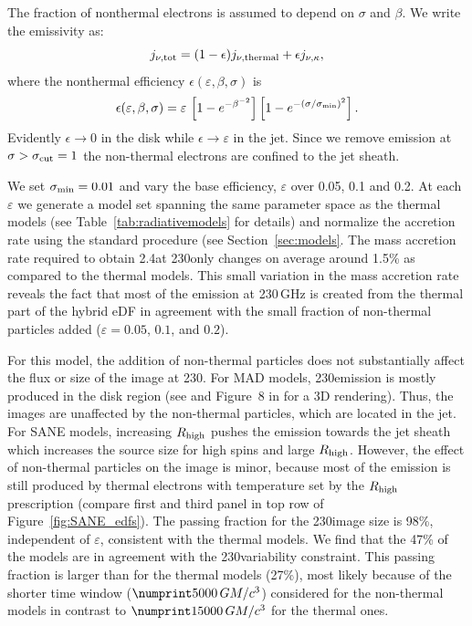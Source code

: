The fraction of nonthermal electrons is assumed to depend on $\sigma$ and $\beta$.
We write the emissivity as:
\begin{equation}
  j_{\nu,\rm{tot}}=(1-\epsilon) j_{\nu,\rm{thermal}} + \epsilon j_{\nu, \kappa},
  \label{eq:kappaeff}
\end{equation}
where the nonthermal efficiency $\epsilon(\varepsilon, \beta, \sigma)$ is
\begin{equation}
  \epsilon(\varepsilon,\beta,\sigma)=\varepsilon\,
  \left[1 - e^{-\beta^{-2}}\right]
  \left[1-e^{-(\sigma/\sigma_{\rm min})^2}\right].
  \label{eq:efficiencybetasigma}
\end{equation}
Evidently $\epsilon \rightarrow 0$ in the disk while $\epsilon \rightarrow \varepsilon$ in the jet.
Since we remove emission at $\sigma > \sigma_{\rm cut} = 1$ the non-thermal electrons are confined to the jet sheath.

We set $\sigma_{\rm min}=0.01$ and vary the base efficiency, $\varepsilon$ over 0.05, 0.1 and 0.2.
At each $\varepsilon$ we generate a model set spanning the same parameter space as the thermal models (see Table~\ref{tab:radiativemodels} for details) and normalize the accretion rate using the standard procedure (see Section~\ref{sec:models}.
The mass accretion rate required to obtain 2.4\Jy at 230\GHz only changes on average around 1.5\% as compared to the thermal models.
This small variation in the mass accretion rate reveals the fact that most of the emission at 230\,GHz is created from the thermal part of the hybrid eDF in agreement with the small fraction of non-thermal particles added ($\varepsilon=0.05$, $0.1$, and $0.2$).

\label{varkappa230}

For this model, the addition of non-thermal particles does not substantially affect the flux or size of the image at 230\GHz.
For MAD models, 230\GHz emission is mostly produced in the disk region (see  and Figure~8 in \citealt{Wong_2022} for a 3D rendering).
Thus, the images are unaffected by the non-thermal particles, which are located in the jet.
For SANE models, increasing $R_\mathrm{high}$ pushes the emission towards the jet sheath which increases the source size for high spins and large $R_\mathrm{high}$.
However, the effect of non-thermal particles on the image is minor, because most of the emission is still produced by thermal electrons with temperature set by the $R_\mathrm{high}$ prescription (compare first and third panel in top row of Figure~\ref{fig:SANE_edfs}).
The passing fraction for the 230\GHz image size is 98\%, independent of $\varepsilon$, consistent with the thermal models. 
We find that the 47\% of the models are in agreement with the 230\GHz variability constraint.
This passing fraction is larger than for the thermal models (27\%), most likely because of the shorter time window ($\no{5000}\,\tg$) considered for the non-thermal models in contrast to $\no{15000}\,\tg$ for the thermal ones.

